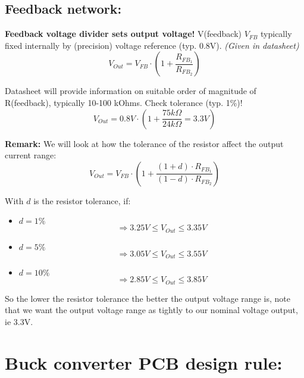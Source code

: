 
\subsection{Feedback network:}
\textbf{Feedback voltage divider sets output voltage!} V(feedback) $V_{FB}$ typically fixed internally by (precision) voltage reference (typ. 0.8V). \emph{(Given in datasheet)}
\[ V_{Out} = V_{FB} \cdot \left(1 + \frac{R_{FB_1}}{R_{FB_2}} \right) \]

Datasheet will provide information on suitable order of magnitude of R(feedback), typically 10-100 kOhms. Check tolerance (typ. 1\%)!
\[ V_{Out} = 0.8V \cdot \left( 1 + \frac{75k\Omega}{24k\Omega} = 3.3V \right) \]

\textbf{Remark:} We will look at how the tolerance of the resistor affect the output current range:
\[ V_{Out} = V_{FB} \cdot \left(1 + \frac{(1 + d) \cdot R_{FB_1}}{(1 - d) \cdot R_{FB_2}} \right) \]

With $d$ is the resistor tolerance, if:
\begin{itemize}
	\item
	$d = 1\%$
	\[ \Rightarrow 3.25V \leq V_{Out} \leq 3.35V \]
	
	\item
	$d = 5\%$
	\[ \Rightarrow 3.05V \leq V_{Out} \leq 3.55V \]
	
	\item
	$d = 10\%$
	\[ \Rightarrow 2.85V \leq V_{Out} \leq 3.85V \]
\end{itemize}
So the lower the resistor tolerance the better the output voltage range is, note that we want the output voltage range as tightly to our nominal voltage output, ie 3.3V.

\section{Buck converter PCB design rule:}